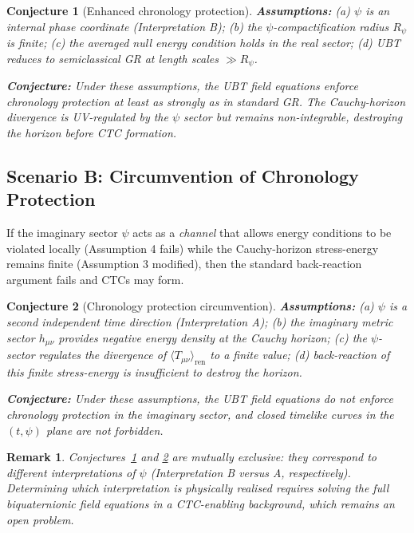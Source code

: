\documentclass[12pt]{article}
\newtheorem{conjecture}{Conjecture}
\newtheorem{remark}{Remark}
\begin{document}
\begin{conjecture}[Enhanced chronology protection]
\label{conj:enhanced_cp}
\textbf{Assumptions:}
(a) $\psi$ is an internal phase coordinate (Interpretation B);
(b) the $\psi$-compactification radius $R_\psi$ is finite;
(c) the averaged null energy condition holds in the real sector;
(d) UBT reduces to semiclassical GR at length scales $\gg R_\psi$.

\textbf{Conjecture:} Under these assumptions, the UBT field equations
enforce chronology protection at least as strongly as in standard GR.
The Cauchy-horizon divergence is UV-regulated by the $\psi$ sector but
remains non-integrable, destroying the horizon before CTC formation.
\end{conjecture}

\subsection{Scenario B: Circumvention of Chronology Protection}
If the imaginary sector $\psi$ acts as a \emph{channel} that allows
energy conditions to be violated locally (Assumption 4 fails) while the
Cauchy-horizon stress-energy remains finite (Assumption 3 modified),
then the standard back-reaction argument fails and CTCs may form.

\begin{conjecture}[Chronology protection circumvention]
\label{conj:circumvention}
\textbf{Assumptions:}
(a) $\psi$ is a second independent time direction (Interpretation A);
(b) the imaginary metric sector $h_{\mu\nu}$ provides negative energy
density at the Cauchy horizon;
(c) the $\psi$-sector regulates the divergence of
$\langle T_{\mu\nu}\rangle_{\mathrm{ren}}$ to a finite value;
(d) back-reaction of this finite stress-energy is insufficient to
destroy the horizon.

\textbf{Conjecture:} Under these assumptions, the UBT field equations
do \emph{not} enforce chronology protection in the imaginary sector,
and closed timelike curves in the $(t,\psi)$ plane are not forbidden.
\end{conjecture}

\begin{remark}
Conjectures~\ref{conj:enhanced_cp} and \ref{conj:circumvention} are
mutually exclusive: they correspond to different interpretations of $\psi$
(Interpretation B versus A, respectively).  Determining which interpretation
is physically realised requires solving the full biquaternionic field
equations in a CTC-enabling background, which remains an open problem.
\end{remark}
\end{document}
